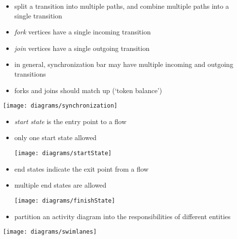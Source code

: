 \documentclass{sepslide-soa-faked} %
\begin{document}
\begin{slide}

  \begin{minipage}{0.6\textwidth} \raggedright
  \begin{itemize}
  \item split a transition into multiple
    paths, and combine multiple paths into a single transition
  \item \emph{fork} vertices have a single incoming transition
  \item \emph{join} vertices have a single outgoing transition
  \item in general, synchronization bar may have multiple incoming and
    outgoing transitions
  \item forks and joins should match up (`token balance')
  \end{itemize}
  \end{minipage}
  \qquad
  \begin{minipage}{0.3\textwidth}
  \texttt{[image: diagrams/synchronization]}
  \end{minipage}
\end{slide}

\begin{slide}
\begin{itemize}
\item \emph{start state} is the entry point to a flow
\item only one start state allowed 
  \bigskip
  \centerline{\texttt{[image: diagrams/startState]}}
\item end states indicate the exit point from a flow
\item multiple end states are allowed
  \bigskip
  \centerline{\texttt{[image: diagrams/finishState]}}
\end{itemize}
\end{slide}

\begin{slide}
\begin{itemize}
\item partition an activity diagram into the responsibilities
  of different entities
\end{itemize}
  \bigskip
  \centerline{\texttt{[image: diagrams/swimlanes]}}
\end{slide}
\end{document}
